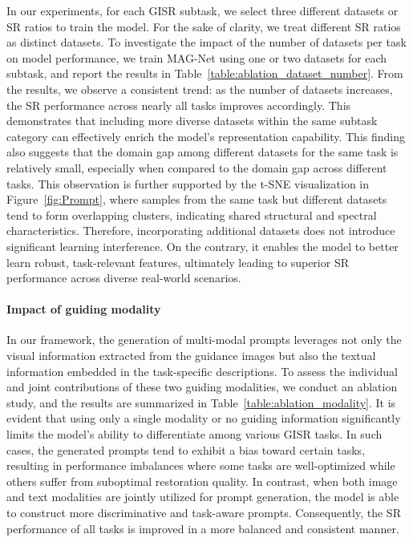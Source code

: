 \documentclass[lettersize,journal]{IEEEtran}
\begin{document}
In our experiments, for each GISR subtask, we select three different datasets or SR ratios to train the model. For the sake of clarity, we treat different SR ratios as distinct datasets. To investigate the impact of the number of datasets per task on model performance, we train MAG-Net using one or two datasets for each subtask, and report the results in Table~\ref{table:ablation_dataset_number}. From the results, we observe a consistent trend: as the number of datasets increases, the SR performance across nearly all tasks improves accordingly. This demonstrates that including more diverse datasets within the same subtask category can effectively enrich the model's representation capability. This finding also suggests that the domain gap among different datasets for the same task is relatively small, especially when compared to the domain gap across different tasks. This observation is further supported by the t-SNE visualization in Figure~\ref{fig:Prompt}, where samples from the same task but different datasets tend to form overlapping clusters, indicating shared structural and spectral characteristics.  Therefore, incorporating additional datasets does not introduce significant learning interference. On the contrary, it enables the model to better learn robust, task-relevant features, ultimately leading to superior SR performance across diverse real-world scenarios.

 
\paragraph{Impact of guiding modality}
In our framework, the generation of multi-modal prompts leverages not only the visual information extracted from the guidance images but also the textual information embedded in the task-specific  descriptions. To assess the individual and joint contributions of these two guiding modalities, we conduct an ablation study, and the results are summarized in Table~\ref{table:ablation_modality}.
It is evident that using only a single modality or no guiding information significantly limits the model’s ability to differentiate among various GISR tasks. In such cases, the generated prompts tend to exhibit a bias toward certain tasks, resulting in performance imbalances where some tasks are well-optimized while others suffer from suboptimal restoration quality. %
In contrast, when both image and text modalities are jointly utilized for prompt generation, the model is able to construct more discriminative and task-aware prompts. 
Consequently, the SR performance of all tasks is improved in a more balanced and consistent manner.

\end{document}
